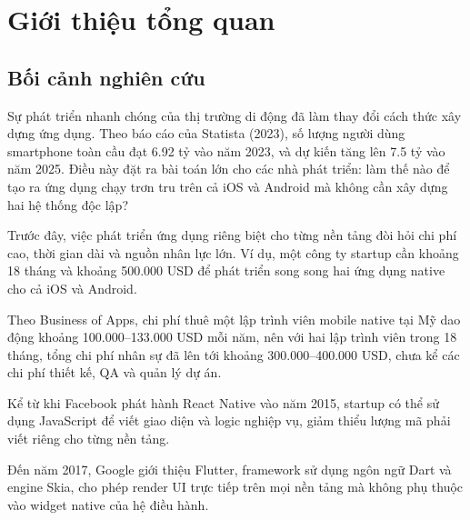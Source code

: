 
\section{Giới thiệu tổng quan}

    \subsection{Bối cảnh nghiên cứu}
    \renewcommand{\labelitemi}{--}    
    \begin{flushleft}
            \hspace*{0.8cm}Sự phát triển nhanh chóng của thị trường di động đã làm thay đổi cách thức xây dựng ứng dụng. Theo báo cáo của Statista (2023), số lượng người dùng smartphone toàn cầu đạt 6.92 tỷ vào năm 2023, và dự kiến tăng lên 7.5 tỷ vào năm 2025. Điều này đặt ra bài toán lớn cho các nhà phát triển: làm thế nào để tạo ra ứng dụng chạy trơn tru trên cả iOS và Android mà không cần xây dựng hai hệ thống độc lập?
    \end{flushleft}

    \begin{flushleft}
        \hspace*{0.8cm}Trước đây, việc phát triển ứng dụng riêng biệt cho từng nền tảng đòi hỏi chi phí cao, thời gian dài và nguồn nhân lực lớn. Ví dụ, một công ty startup cần khoảng 18 tháng và khoảng 500.000 USD để phát triển song song hai ứng dụng native cho cả iOS và Android.
    \end{flushleft}

    \begin{flushleft}
        \hspace*{0.8cm}Theo Business of Apps, chi phí thuê một lập trình viên mobile native tại Mỹ dao động khoảng 100.000–133.000 USD mỗi năm, nên với hai lập trình viên trong 18 tháng, tổng chi phí nhân sự đã lên tới khoảng 300.000–400.000 USD, chưa kể các chi phí thiết kế, QA và quản lý dự án.
      \end{flushleft}

      \begin{flushleft}
        \hspace*{0.8cm}Kể từ khi Facebook phát hành React Native vào năm 2015, startup có thể sử dụng JavaScript để viết giao diện và logic nghiệp vụ, giảm thiểu lượng mã phải viết riêng cho từng nền tảng.
      \end{flushleft}

      \begin{flushleft}
        \hspace*{0.8cm}Đến năm 2017, Google giới thiệu Flutter, framework sử dụng ngôn ngữ Dart và engine Skia, cho phép render UI trực tiếp trên mọi nền tảng mà không phụ thuộc vào widget native của hệ điều hành.
      \end{flushleft}

